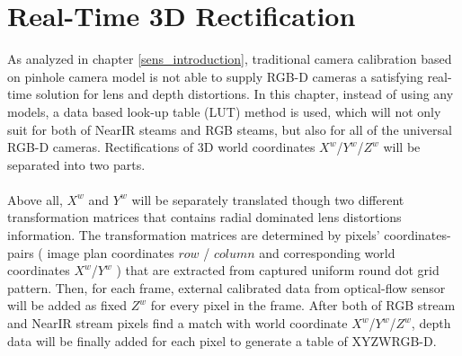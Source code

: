%
\chapter{Real-Time 3D Rectification} %
\label{sens_Rectification} %
As analyzed in chapter \ref{sens_introduction}, traditional camera calibration based on pinhole camera model is not able to supply RGB-D cameras a satisfying real-time solution for lens and depth distortions. In this chapter, instead of using any models, a data based look-up table (LUT) method is used, which will not only suit for both of NearIR steams and RGB steams, but also for all of the universal RGB-D cameras. Rectifications of 3D world coordinates \(X^{w}\)/\(Y^{w}\)/\(Z^{w}\) will be separated into two parts. 
\\\\%
Above all, \(X^{w}\) and \(Y^{w}\) will be separately translated though two different transformation matrices that contains radial dominated lens distortions information. The transformation matrices are determined by pixels' coordinates-pairs ( image plan coordinates \(row\) / \(column\) and corresponding world coordinates \(X^{w}\)/\(Y^{w}\) ) that are extracted from captured uniform round dot grid pattern. Then, for each frame, external calibrated data from optical-flow sensor will be added as fixed \(Z^{w}\) for every pixel in the frame. After both of RGB stream and NearIR stream pixels find a match with world coordinate \(X^{w}\)/\(Y^{w}\)/\(Z^{w}\), depth data will be finally added for each pixel to generate a table of XYZWRGB-D.

